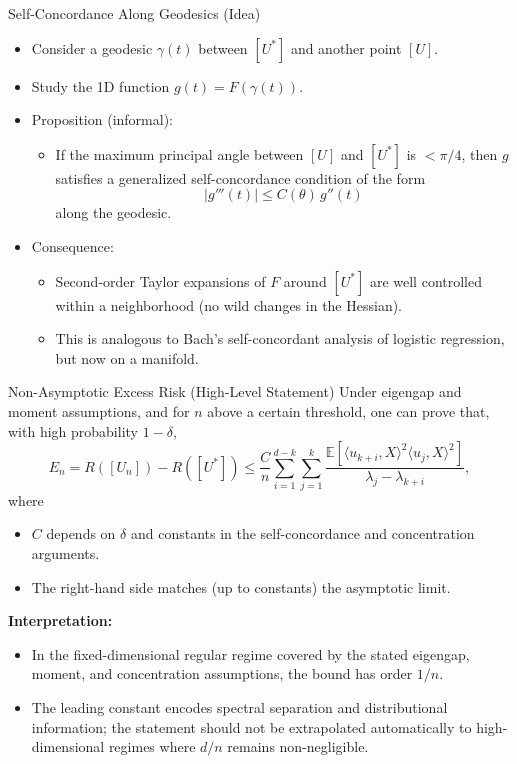 \documentclass{beamer}
\newcommand{\E}{\mathbb{E}}
\newcommand{\1}{\mathbbm{1}}
\begin{document}
\begin{frame}{Self-Concordance Along Geodesics (Idea)} %
  \small
  \begin{itemize}
    \item Consider a geodesic $\gamma(t)$ between $[U^\ast]$ and another point $[U]$.
    \item Study the 1D function $g(t) = F(\gamma(t))$.
    \item Proposition (informal):
    \begin{itemize}
      \item If the maximum principal angle between $[U]$ and $[U^\ast]$ is $< \pi/4$,
      then $g$ satisfies a generalized self-concordance condition of the form
      \[
        |g'''(t)| \le C(\theta)\, g''(t)
      \]
      along the geodesic.
    \end{itemize}
    \item Consequence:
    \begin{itemize}
      \item Second-order Taylor expansions of $F$ around $[U^\ast]$ are well controlled
      within a neighborhood (no wild changes in the Hessian).
      \item This is analogous to Bach’s self-concordant analysis of logistic regression,
      but now on a manifold.
    \end{itemize}
  \end{itemize}
\end{frame}

\begin{frame}{Non-Asymptotic Excess Risk (High-Level Statement)} %
  \small
  Under eigengap and moment assumptions, and for $n$ above a certain threshold,
  one can prove that, with high probability $1-\delta$,
  \[
    E_n = R([U_n]) - R([U^\ast])
    \le \frac{C}{n}
    \sum_{i=1}^{d-k}\sum_{j=1}^k
    \frac{\E[\langle u_{k+i}, X\rangle^2 \langle u_j, X\rangle^2]}
         {\lambda_j - \lambda_{k+i}},
  \]
  where
  \begin{itemize}
    \item $C$ depends on $\delta$ and constants in the self-concordance and
    concentration arguments.
    \item The right-hand side matches (up to constants) the asymptotic limit.
  \end{itemize}
  \vspace{0.2cm}
  \textbf{Interpretation:}
  \begin{itemize}
    \item In the fixed-dimensional regular regime covered by the stated eigengap, moment, and concentration assumptions, the bound has order $1/n$.
    \item The leading constant encodes spectral separation and distributional information; the statement should not be extrapolated automatically to high-dimensional regimes where $d/n$ remains non-negligible.
  \end{itemize}
\end{frame}
\end{document}

